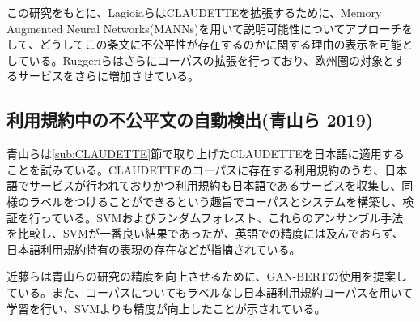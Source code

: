 この研究をもとに、Lagioiaら\cite{Lagioia2019}はCLAUDETTEを拡張するために、Memory Augmented Neural Networks(MANNs)\cite{arxiv.1410.3916}\cite{arxiv.1410.5401}を用いて説明可能性についてアプローチをして、どうしてこの条文に不公平性が存在するのかに関する理由の表示を可能としている。Ruggeriら\cite{Ruggeri_2021}はさらにコーパスの拡張を行っており、欧州圏の対象とするサービスをさらに増加させている。

\subsection{利用規約中の不公平文の自動検出(青山ら 2019)}
青山ら\cite{weko_199608_1}は\ref{sub:CLAUDETTE}節で取り上げたCLAUDETTEを日本語に適用することを試みている。CLAUDETTEのコーパスに存在する利用規約のうち、日本語でサービスが行われておりかつ利用規約も日本語であるサービスを収集し、同様のラベルをつけることができるという趣旨でコーパスとシステムを構築し、検証を行っている。SVMおよびランダムフォレスト、これらのアンサンブル手法を比較し、SVMが一番良い結果であったが、英語での精度には及んでおらず、日本語利用規約特有の表現の存在などが指摘されている。

近藤ら\cite{近藤2021}は青山らの研究の精度を向上させるために、GAN-BERT\cite{croce-etal-2020-gan}の使用を提案している。また、コーパスについてもラベルなし日本語利用規約コーパスを用いて学習を行い、SVMよりも精度が向上したことが示されている。


